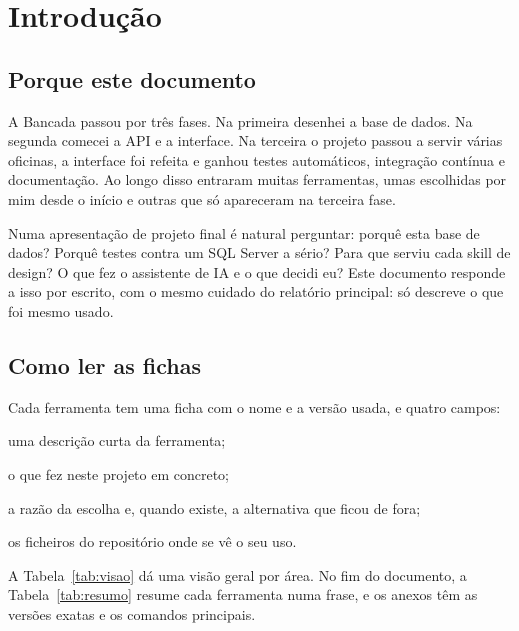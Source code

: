 \documentclass[a4paper,12pt]{article}
\begin{document}
\clearpage

\section{Introdução}

\subsection{Porque este documento}

A Bancada passou por três fases. Na primeira desenhei a base de dados. Na segunda comecei a API e a interface. Na terceira o projeto passou a servir várias oficinas, a interface foi refeita e ganhou testes automáticos, integração contínua e documentação. Ao longo disso entraram muitas ferramentas, umas escolhidas por mim desde o início e outras que só apareceram na terceira fase.

Numa apresentação de projeto final é natural perguntar: porquê esta base de dados? Porquê testes contra um SQL Server a sério? Para que serviu cada skill de design? O que fez o assistente de IA e o que decidi eu? Este documento responde a isso por escrito, com o mesmo cuidado do relatório principal: só descreve o que foi mesmo usado.

\subsection{Como ler as fichas}

Cada ferramenta tem uma ficha com o nome e a versão usada, e quatro campos:
\begin{description}[leftmargin=3.1cm,labelwidth=2.8cm,labelsep=0.3cm,font=\normalfont\bfseries]
  \item[O que é] uma descrição curta da ferramenta;
  \item[Para que serviu] o que fez neste projeto em concreto;
  \item[Porquê] a razão da escolha e, quando existe, a alternativa que ficou de fora;
  \item[Onde está] os ficheiros do repositório onde se vê o seu uso.
\end{description}

A Tabela~\ref{tab:visao} dá uma visão geral por área. No fim do documento, a Tabela~\ref{tab:resumo} resume cada ferramenta numa frase, e os anexos têm as versões exatas e os comandos principais.
\end{document}
